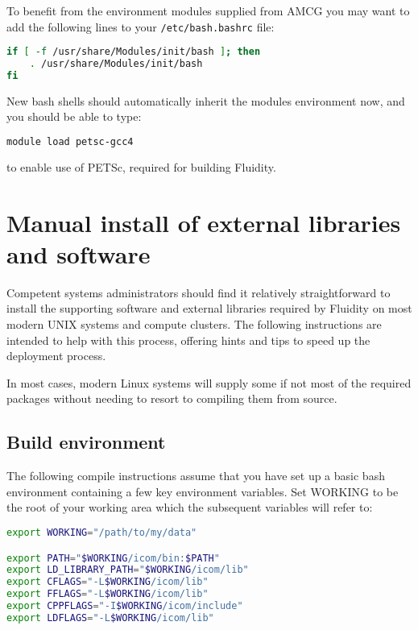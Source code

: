 To benefit from the environment modules supplied from AMCG you may want to add
the following lines to your \lstinline[language=bash]+/etc/bash.bashrc+ file:

\begin{lstlisting}[language=bash]
if [ -f /usr/share/Modules/init/bash ]; then
    . /usr/share/Modules/init/bash
fi
\end{lstlisting}

New bash shells should automatically inherit the modules environment now, and
you should be able to type:

\begin{lstlisting}[language=bash]
module load petsc-gcc4
\end{lstlisting}

to enable use of PETSc, required for building Fluidity.
 
\section{Manual install of external libraries and software}
\label{sect:required_ḻibraries_manual_install}

Competent systems administrators should find it relatively straightforward to
install the supporting software and external libraries required by Fluidity on
most modern UNIX systems and compute clusters. The following instructions are
intended to help with this process, offering hints and tips to speed up the
deployment process.

In most cases, modern Linux systems will supply some if not most of the
required packages without needing to resort to compiling them from source.

\subsection{Build environment}
\label{sect:required_libraries_build_environment}

The following compile instructions assume that you have set up a basic bash
environment containing a few key environment variables. Set WORKING to be the
root of your working area which the subsequent variables will refer to:

\begin{lstlisting}[language=bash]
export WORKING="/path/to/my/data"

export PATH="$WORKING/icom/bin:$PATH"
export LD_LIBRARY_PATH="$WORKING/icom/lib"
export CFLAGS="-L$WORKING/icom/lib"
export FFLAGS="-L$WORKING/icom/lib"
export CPPFLAGS="-I$WORKING/icom/include"
export LDFLAGS="-L$WORKING/icom/lib"
\end{lstlisting}

